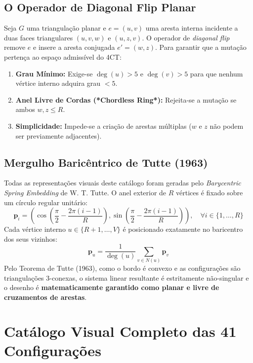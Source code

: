 \documentclass[10pt,a4paper]{article}
\begin{document}
\subsection{O Operador de Diagonal Flip Planar}
Seja $G$ uma triangulação planar e $e = (u, v)$ uma aresta interna incidente a duas faces triangulares $(u, v, w)$ e $(u, z, v)$. O operador de \emph{diagonal flip} remove $e$ e insere a aresta conjugada $e' = (w, z)$. Para garantir que a mutação pertença ao espaço admissível do 4CT:
\begin{enumerate}
    \item \textbf{Grau Mínimo:} Exige-se $\deg(u) > 5$ e $\deg(v) > 5$ para que nenhum vértice interno adquira grau $< 5$.
    \item \textbf{Anel Livre de Cordas (*Chordless Ring*):} Rejeita-se a mutação se ambos $w, z \le R$.
    \item \textbf{Simplicidade:} Impede-se a criação de arestas múltiplas ($w$ e $z$ não podem ser previamente adjacentes).
\end{enumerate}

\subsection{Mergulho Baricêntrico de Tutte (1963)}
Todas as representações visuais deste catálogo foram geradas pelo \emph{Barycentric Spring Embedding} de W. T. Tutte. O anel exterior de $R$ vértices é fixado sobre um círculo regular unitário:
\[
\mathbf{p}_i = \left(\cos\left(\frac{\pi}{2} - \frac{2\pi(i-1)}{R}\right), \sin\left(\frac{\pi}{2} - \frac{2\pi(i-1)}{R}\right)\right), \quad \forall i \in \{1, \dots, R\}
\]
Cada vértice interno $u \in \{R+1, \dots, V\}$ é posicionado exatamente no baricentro dos seus vizinhos:
\[
\mathbf{p}_u = \frac{1}{\deg(u)} \sum_{v \in N(u)} \mathbf{p}_v
\]
Pelo Teorema de Tutte (1963), como o bordo é convexo e as configurações são triangulações 3-conexas, o sistema linear resultante é estritamente não-singular e o desenho é \textbf{matematicamente garantido como planar e livre de cruzamentos de arestas}.

\newpage
\section{Catálogo Visual Completo das 41 Configurações}
\end{document}
